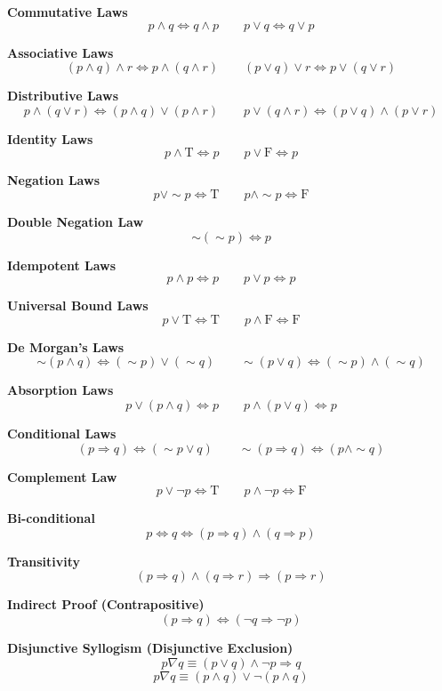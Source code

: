 \textbf{Commutative Laws}
\[
	p \land q \Leftrightarrow q \land p \qquad p \lor q \Leftrightarrow q \lor p
\]

\textbf{Associative Laws}
\[
	(p \land q) \land r \Leftrightarrow p \land (q \land r) \qquad (p \lor q) \lor r \Leftrightarrow p \lor (q \lor r)
\]

\textbf{Distributive Laws}
\[
	p \land (q \lor r) \Leftrightarrow (p \land q) \lor (p \land r) \qquad
	p \lor (q \land r) \Leftrightarrow (p \lor q) \land (p \lor r)
\]

\textbf{Identity Laws}
\[
	p \land \text{T} \Leftrightarrow p \qquad p \lor \text{F} \Leftrightarrow p
\]

\textbf{Negation Laws}
\[
	p \lor \sim p \Leftrightarrow \text{T} \qquad p \land \sim p \Leftrightarrow \text{F}
\]

\textbf{Double Negation Law}
\[
	\sim(\sim p) \Leftrightarrow p
\]

\textbf{Idempotent Laws}
\[
	p \land p \Leftrightarrow p \qquad p \lor p \Leftrightarrow p
\]

\textbf{Universal Bound Laws}
\[
	p \lor \text{T} \Leftrightarrow \text{T} \qquad p \land \text{F} \Leftrightarrow \text{F}
\]

\textbf{De Morgan’s Laws}
\[
	\sim (p \land q) \Leftrightarrow (\sim p) \lor (\sim q) \qquad
	\sim (p \lor q) \Leftrightarrow (\sim p) \land (\sim q)
\]

\textbf{Absorption Laws}
\[
	p \lor (p \land q) \Leftrightarrow p \qquad p \land (p \lor q) \Leftrightarrow p
\]

\textbf{Conditional Laws}
\[
	(p \Rightarrow q) \Leftrightarrow (\sim p \lor q) \qquad \sim(p \Rightarrow q) \Leftrightarrow (p \land \sim q)
\]

\textbf{Complement Law}
\[
	p \lor \neg p \Leftrightarrow \text{T} \qquad p \land \neg p \Leftrightarrow \text{F}
\]

\textbf{Bi-conditional}
\[
	p \Leftrightarrow q \Leftrightarrow (p \Rightarrow q) \land (q \Rightarrow p)
\]

\textbf{Transitivity}
\[
	(p \Rightarrow q) \land (q \Rightarrow r) \Rightarrow (p \Rightarrow r)
\]

\textbf{Indirect Proof (Contrapositive)}
\[
	(p \Rightarrow q) \Leftrightarrow (\neg q \Rightarrow \neg p)
\]

\textbf{Disjunctive Syllogism (Disjunctive Exclusion)}
\[
	p \nabla q \equiv (p \lor q) \land \neg p \Rightarrow q
\]
\[
	p \nabla q \equiv(p \land q) \lor \neg  (p \land q)
\]

